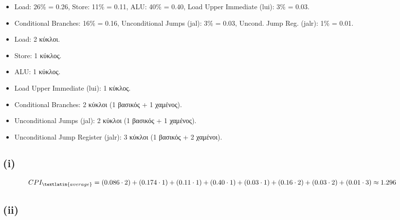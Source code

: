 \documentclass{article}
\newcommand{\skato}{\hspace{0.25cm}}
\begin{document}
\begin{itemize}
    \item \textlatin{Load}: 26\% = 0.26, \skato \textlatin{Store}: 11\% = 0.11, \skato \textlatin{ALU}: 40\% = 0.40, \skato \textlatin{Load Upper Immediate (lui)}: 3\% = 0.03.
    \item \textlatin{Conditional Branches}: 16\% = 0.16, \skato \textlatin{Unconditional Jumps (jal)}: 3\% = 0.03, \skato \textlatin{Uncond. Jump Reg. (jalr)}: 1\% = 0.01.
\end{itemize}

\begin{itemize}
    \item \textlatin{Load}: 2 κύκλοι.
    \item \textlatin{Store}: 1 κύκλος.
    \item \textlatin{ALU}: 1 κύκλος.
    \item \textlatin{Load Upper Immediate (lui)}: 1 κύκλος.
    \item \textlatin{Conditional Branches}: 2 κύκλοι (1 βασικός + 1 χαμένος).
    \item \textlatin{Unconditional Jumps (jal)}: 2 κύκλοι (1 βασικός + 1 χαμένος).
    \item \textlatin{Unconditional Jump Register (jalr)}: 3 κύκλοι (1 βασικός + 2 χαμένοι).
\end{itemize}

\subsection*{(\textlatin{i})}

\[
CPI_{\textlatin{average}} = (0.086 \cdot 2) + (0.174 \cdot 1) + (0.11 \cdot 1) + (0.40 \cdot 1) + (0.03 \cdot 1) + (0.16 \cdot 2) + (0.03 \cdot 2) + (0.01 \cdot 3) \approx 1.296
\]

\subsection*{\textlatin{(ii)}}
\end{document}
